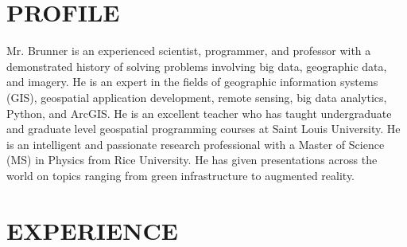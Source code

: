 \documentclass{res}
\begin{document}
 
\address{\bf HOME ADDRESS\\122 Arabian Path\\ 
St. Peters, MO 63376\\ 636-222-3818\\ gregbrunn@gmail.com}
\address{\bf WORK ADDRESS \\ 3060 Little Hills Expy\\  St. Charles, MO 63301\\  636-949-6620 ext. 8557\\
gbrunner@esri.com}
                                  
\begin{resume}
\section{PROFILE}
Mr. Brunner is an experienced scientist, programmer, and professor with a demonstrated history of solving problems involving big data, geographic data, and imagery. He is an expert in the fields of geographic information systems (GIS), geospatial application development, remote sensing, big data analytics, Python, and ArcGIS. He is an excellent teacher who has taught undergraduate and graduate level geospatial programming courses at Saint Louis University. He is an intelligent and passionate research professional with a Master of Science (MS) in Physics from Rice University. He has given presentations across the world on topics ranging from green infrastructure to augmented reality.

\section{EXPERIENCE}
   \vspace{-0.1in}	


\end{resume}
\end{document}
